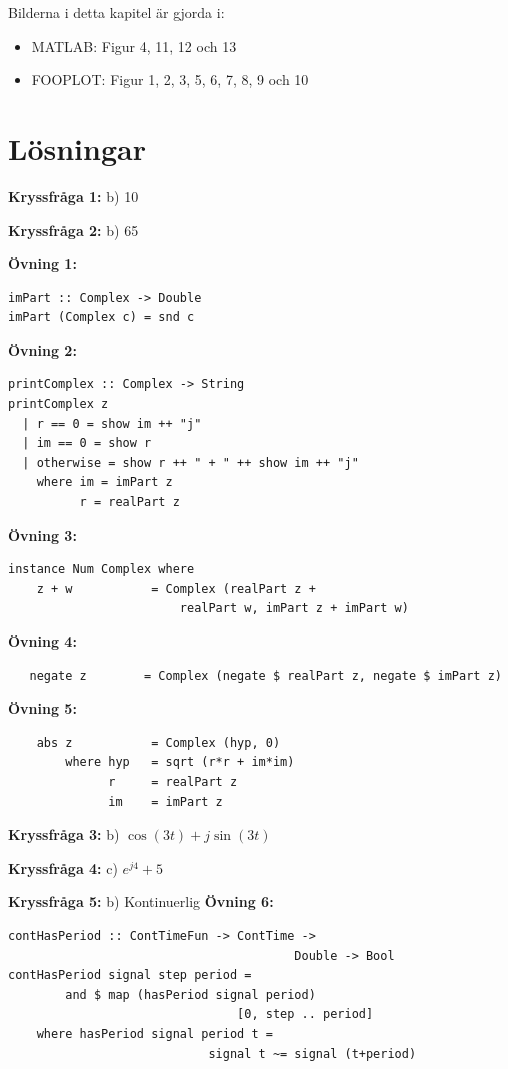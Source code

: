 \documentclass{article}
\begin{document}
Bilderna i detta kapitel är gjorda i:  
\begin{itemize}
\item MATLAB: Figur 4, 11, 12 och 13
\item FOOPLOT: Figur 1, 2, 3, 5, 6, 7, 8, 9 och 10
\end{itemize}

\newpage
\section{Lösningar}

\textbf{Kryssfråga 1:} b) 10

\textbf{Kryssfråga 2:} b) 65

\textbf{Övning 1:}
\begin{verbatim}
imPart :: Complex -> Double
imPart (Complex c) = snd c
\end{verbatim}
\textbf{Övning 2:}
\begin{verbatim}
printComplex :: Complex -> String
printComplex z
  | r == 0 = show im ++ "j"
  | im == 0 = show r
  | otherwise = show r ++ " + " ++ show im ++ "j"
    where im = imPart z
          r = realPart z
\end{verbatim}
\textbf{Övning 3:}
\begin{verbatim}
instance Num Complex where
    z + w           = Complex (realPart z + 
                        realPart w, imPart z + imPart w)
\end{verbatim}

\textbf{Övning 4:}
\begin{verbatim}
   negate z        = Complex (negate $ realPart z, negate $ imPart z)
\end{verbatim}

\textbf{Övning 5:}
\begin{verbatim}
    abs z           = Complex (hyp, 0)
        where hyp   = sqrt (r*r + im*im)
              r     = realPart z
              im    = imPart z
\end{verbatim}
\textbf{Kryssfråga 3:} b) $\cos(3t) + j\sin(3t)$

\textbf{Kryssfråga 4:} c) $e^{j4} + 5$

\textbf{Kryssfråga 5:} b) Kontinuerlig
\newline
\textbf{Övning 6:}
\begin{verbatim}
contHasPeriod :: ContTimeFun -> ContTime -> 
                                        Double -> Bool
contHasPeriod signal step period = 
        and $ map (hasPeriod signal period) 
                                [0, step .. period]
    where hasPeriod signal period t = 
                            signal t ~= signal (t+period)
\end{verbatim}
\end{document}

